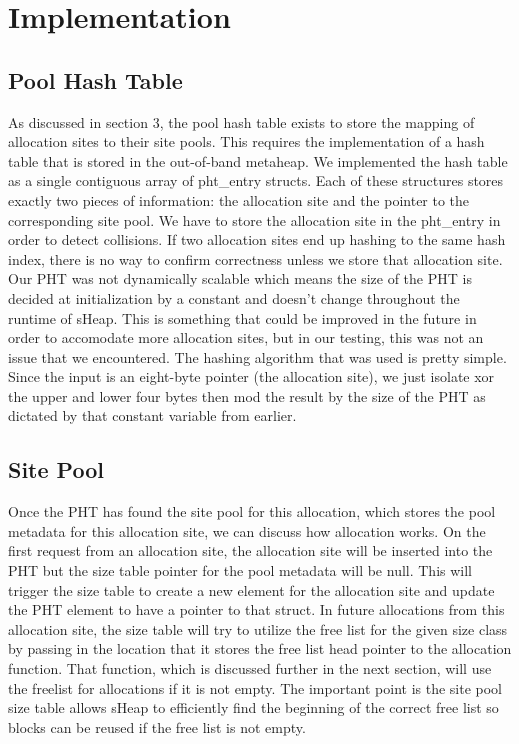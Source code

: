 \documentclass[conference]{IEEEtran}
\begin{document}
\section{Implementation}

\subsection{Pool Hash Table}
As discussed in section 3, the pool hash table exists to store the mapping of 
allocation sites to their site pools. This requires the implementation of a hash 
table that is stored in the out-of-band metaheap. We implemented the hash table as 
a single contiguous array of pht\_entry structs. Each of these structures stores 
exactly two pieces of information: the allocation site and the pointer to the 
corresponding site pool. We have to store the allocation site in the pht\_entry in 
order to detect collisions. If two allocation sites end up hashing to the same 
hash index, there is no way to confirm correctness unless we store that allocation 
site. Our PHT was not dynamically scalable which means the size of the PHT is 
decided at initialization by a constant and doesn’t change throughout the runtime 
of sHeap. This is something that could be improved in the future in order to 
accomodate more allocation sites, but in our testing, this was not an issue that 
we encountered. The hashing algorithm that was used is pretty simple. Since the 
input is an eight-byte pointer (the allocation site), we just isolate xor the 
upper and lower four bytes then mod the result by the size of the PHT as 
dictated by that constant variable from earlier.

\subsection{Site Pool}
Once the PHT has found the site pool for this allocation, which stores the pool metadata for this allocation site, we can discuss how allocation works. 
On the first request from an allocation site, the allocation site will be 
inserted into the PHT but the size table pointer for the pool metadata will be 
null. This will trigger the size table to create a new element for the 
allocation site and update the PHT element to have a pointer to that struct. In 
future allocations from this allocation site, the size table will try to utilize 
the free list for the given size class by passing in the location that it stores 
the free list head pointer to the allocation function. That function, which is discussed further in the next section, will use the freelist for allocations if it is not empty.  The important point is the site pool size table allows sHeap to efficiently find the beginning of the correct free list so blocks can be reused if the free list is not empty. 
\end{document}
